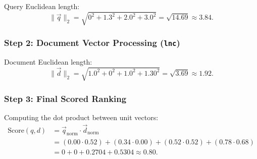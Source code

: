 Query Euclidean length:
\begin{equation}
\|\vec{q}\|_2 = \sqrt{0^2 + 1.3^2 + 2.0^2 + 3.0^2} = \sqrt{14.69} \approx \mathbf{3.84}.
\end{equation}

\subsubsection{Step 2: Document Vector Processing (\texttt{lnc})}

\begin{table}[H]
\centering
{}
\caption{Document vector computation under the \texttt{lnc} scheme.}
\label{tab:doc-lnc-en}
\end{table}

Document Euclidean length:
\begin{equation}
\|\vec{d}\|_2 = \sqrt{1.0^2 + 0^2 + 1.0^2 + 1.30^2} = \sqrt{3.69} \approx \mathbf{1.92}.
\end{equation}

\subsubsection{Step 3: Final Scored Ranking}
Computing the dot product between unit vectors:
\begin{align}
\text{Score}(q, d) &= \vec{q}_{\text{norm}} \cdot \vec{d}_{\text{norm}} \nonumber \\
                   &= (0.00 \cdot 0.52) + (0.34 \cdot 0.00) + (0.52 \cdot 0.52) + (0.78 \cdot 0.68) \nonumber \\
                   &= 0 + 0 + 0.2704 + 0.5304 \approx \mathbf{0.80}.
\end{align}

